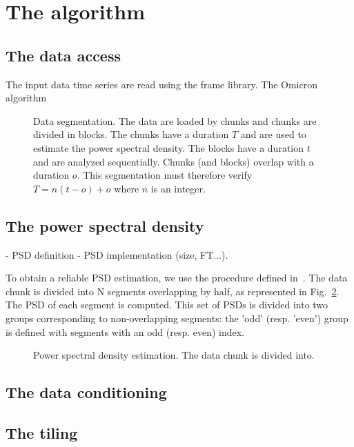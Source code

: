 \section{The algorithm} \label{sec:algorithm}

\subsection{The data access} \label{sec:algorithm:data}
The input data time series are read using the frame library. The Omicron algorithm

\begin{figure}
  \center
  \caption{Data segmentation. The data are loaded by chunks and chunks are divided in blocks. The chunks have a duration $T$ and are used to estimate the power spectral density. The blocks have a duration $t$ and are analyzed sequentially. Chunks (and blocks) overlap with a duration $o$. This segmentation must therefore verify $T=n(t-o)+o$ where $n$ is an integer.}
  \label{fig:segmentation}
\end{figure}

\subsection{The power spectral density} \label{sec:algorithm:psd}
- PSD definition - PSD implementation (size, FT...).

To obtain a reliable PSD estimation, we use the procedure defined in~\cite{psd}.
The data chunk is divided into N segments overlapping by half, as represented in Fig.~\ref{fig:mmm}. The PSD of each segment is computed. This set of PSDs is divided into two groups corresponding to non-overlapping segments: the 'odd' (resp. 'even') group is defined with segments with an odd (resp. even) index.
\begin{figure}
  \center
  \caption{Power spectral density estimation. The data chunk is divided into.}
  \label{fig:mmm}
\end{figure}

\subsection{The data conditioning} \label{sec:algorithm:conditioning}

\subsection{The tiling} \label{sec:algorithm:tiling}

